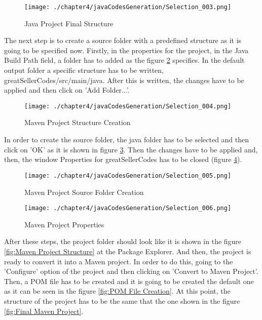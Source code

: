 \begin{figure}
\centering
{\texttt{[image: ./chapter4/javaCodesGeneration/Selection\_003.png]}}
\caption{Java Project Final Structure}
\label{fig:Java Project Final Structure}
\end{figure}

The next step is to create a source folder with a predefined structure as it is going to be specified now. Firstly, in the properties for the project, in the Java Build Path field, a folder has to added as the figure \ref{fig:Maven Project Structure Creation} specifies. In the default output folder a specific structure has to be written, greatSellerCodes/src/main/java. After this is written, the changes have to be applied and then click on 'Add Folder...'.

\begin{figure}
\centering
{\texttt{[image: ./chapter4/javaCodesGeneration/Selection\_004.png]}}
\caption{Maven Project Structure Creation}
\label{fig:Maven Project Structure Creation}
\end{figure}

In order to create the source folder, the java folder has to be selected and then click on 'OK' as it is shown in figure \ref{fig:Maven Project Source Folder Creation}. Then the changes have to be applied and, then, the window Properties for greatSellerCodes has to be closed (figure \ref{fig:Maven Project Properties}).

\begin{figure}
\centering
{\texttt{[image: ./chapter4/javaCodesGeneration/Selection\_005.png]}}
\caption{Maven Project Source Folder Creation}
\label{fig:Maven Project Source Folder Creation}
\end{figure}

\begin{figure}
\centering
{\texttt{[image: ./chapter4/javaCodesGeneration/Selection\_006.png]}}
\caption{Maven Project Properties}
\label{fig:Maven Project Properties}
\end{figure}

After these steps, the project folder should look like it is shown in the figure \ref{fig:Maven Project Structure} at the Package Explorer. And then, the project is ready to convert it into a Maven project. In order to do this, going to the 'Configure' option of the project and then clicking on 'Convert to Maven Project'. Then, a POM file has to be created and it is going to be created the default one as it can be seen in the figure \ref{fig:POM File Creation}. At this point, the structure of the project has to be the same that the one shown in the figure \ref{fig:Final Maven Project}.

